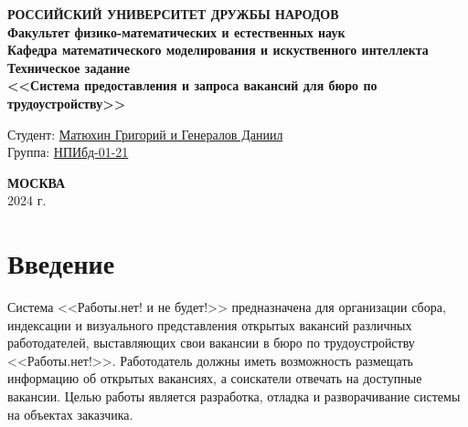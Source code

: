 \documentclass[a4page]{article}
\begin{document}

\begin{titlepage}

\begin{center}
\hfill \break
\textbf{
\large{РОССИЙСКИЙ УНИВЕРСИТЕТ ДРУЖБЫ НАРОДОВ}\\
\normalsize{Факультет физико-математических и естественных наук}\\ 
\normalsize{Кафедра математического моделирования и искуственного интеллекта}\\
}
\vspace*{\fill}
\Large{\textbf{Техническое задание\\ \Large<<Система предоставления и запроса вакансий для бюро по трудоустройству>>}}
\vspace*{\fill}

\end{center}
 
 \begin{flushright}
 Студент: \underline{Матюхин Григорий и Генералов Даниил}\\ \vspace{0.5cm}
 Группа: \underline{НПИбд-01-21}
 \end{flushright}
 
 
\begin{center} \textbf{МОСКВА} \\ 2024 г. \end{center}
\thispagestyle{empty} %

\end{titlepage}

\newpage

\tableofcontents

\newpage

\section{Введение}

Система <<Работы.нет! и не будет!>> предназначена для организации сбора, индексации и визуального представления открытых вакансий различных работодателей, выставляющих свои вакансии в бюро по трудоустройству <<Работы.нет!>>. Работодатель должны иметь возможность размещать информацию об открытых вакансиях, а соискатели отвечать на доступные вакансии.
Целью работы является разработка, отладка и разворачивание системы на объектах заказчика.
\end{document}
